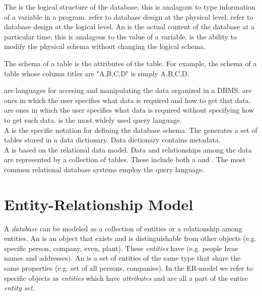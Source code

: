 \documentclass{article}
\begin{document}
The  is the logical structure of the database; this is analagous to type information of a variable in a program.  refer to database design at the physical level.  refer to database design at the logical level. An  is the actual content of the database at a particular time; this is analagous to the value of a variable.  is the ability to modify the physical schema without changing the logical schema. \\ 

\begin{remark}
  The schema of a table is the attributes of the table. For example, the schema of a table whose column titles are "A,B,C,D" is simply A,B,C,D. 
\end{remark}

 are languages for accesing and manipulating the data organized in a DBMS.  are ones in which the user specifies what data is required and how to get that data.  are ones in which the user specifies what data is required without specifying how to get such data.  is the most widely used query language. \\ 

A  is the specific notation for defining the database schema. The  generates a set of tables stored in a data dictionary. Data dictionary contains metadata. \\ 

A  is based on the relational data model. Data and relationships among the data are represented by a collection of tables. These include both a  and . The most common relational database systems employ the  query language. 

\section{Entity-Relationship Model}

A \emph{database} can be modeled as a collection of entities or a relationship among entities. An  is an object that exists and is distinguishable from other objects (e.g. specific person, company, even, plant). These \emph{entities} have  (e.g. people hvae names and addresses). An  is a set of entities of the same type that share the same properties (e.g. set of all persons, companies). In the ER-model we refer to specific objects as \emph{entities} which have \emph{attributes} and are all a part of the entire \emph{entity set}. \\ 
\end{document}
